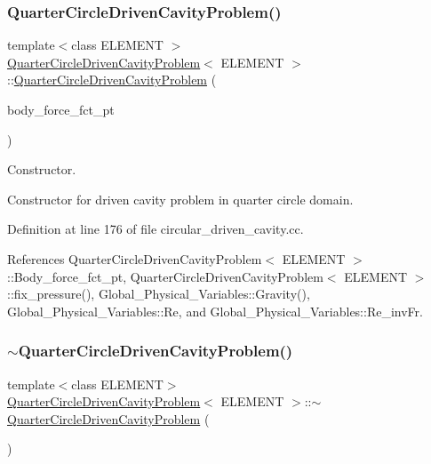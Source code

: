 \subsubsection{\texorpdfstring{Quarter\+Circle\+Driven\+Cavity\+Problem()}{QuarterCircleDrivenCavityProblem()}}
{\footnotesize\ttfamily template$<$class E\+L\+E\+M\+E\+NT $>$ \\
\hyperlink{classQuarterCircleDrivenCavityProblem}{Quarter\+Circle\+Driven\+Cavity\+Problem}$<$ E\+L\+E\+M\+E\+NT $>$\+::\hyperlink{classQuarterCircleDrivenCavityProblem}{Quarter\+Circle\+Driven\+Cavity\+Problem} (\begin{DoxyParamCaption}\item[{Navier\+Stokes\+Equations$<$ 2 $>$\+::Navier\+Stokes\+Body\+Force\+Fct\+Pt}]{body\+\_\+force\+\_\+fct\+\_\+pt }\end{DoxyParamCaption})}



Constructor. 

Constructor for driven cavity problem in quarter circle domain. 

Definition at line 176 of file circular\+\_\+driven\+\_\+cavity.\+cc.



References Quarter\+Circle\+Driven\+Cavity\+Problem$<$ E\+L\+E\+M\+E\+N\+T $>$\+::\+Body\+\_\+force\+\_\+fct\+\_\+pt, Quarter\+Circle\+Driven\+Cavity\+Problem$<$ E\+L\+E\+M\+E\+N\+T $>$\+::fix\+\_\+pressure(), Global\+\_\+\+Physical\+\_\+\+Variables\+::\+Gravity(), Global\+\_\+\+Physical\+\_\+\+Variables\+::\+Re, and Global\+\_\+\+Physical\+\_\+\+Variables\+::\+Re\+\_\+inv\+Fr.

\mbox{\label{classQuarterCircleDrivenCavityProblem_a07410fd9d1194613f92dd6620fa3207a}} 
\subsubsection{\texorpdfstring{$\sim$\+Quarter\+Circle\+Driven\+Cavity\+Problem()}{~QuarterCircleDrivenCavityProblem()}}
{\footnotesize\ttfamily template$<$class E\+L\+E\+M\+E\+NT$>$ \\
\hyperlink{classQuarterCircleDrivenCavityProblem}{Quarter\+Circle\+Driven\+Cavity\+Problem}$<$ E\+L\+E\+M\+E\+NT $>$\+::$\sim$\hyperlink{classQuarterCircleDrivenCavityProblem}{Quarter\+Circle\+Driven\+Cavity\+Problem} (\begin{DoxyParamCaption}{ }\end{DoxyParamCaption})\hspace{0.3cm}{\ttfamily [inline]}}



